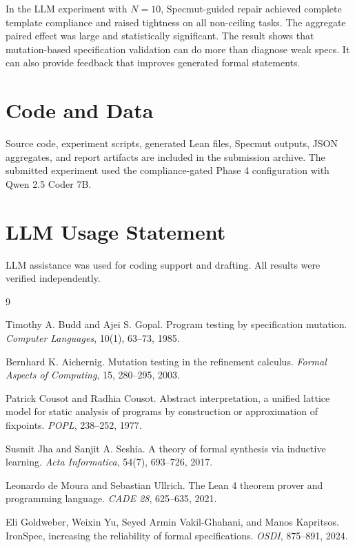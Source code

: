 \documentclass[11pt]{article}
\begin{document}
In the LLM experiment with $N=10$, Specmut-guided repair achieved complete template compliance and raised tightness on all non-ceiling tasks. The aggregate paired effect was large and statistically significant. The result shows that mutation-based specification validation can do more than diagnose weak specs. It can also provide feedback that improves generated formal statements.

\section*{Code and Data}

Source code, experiment scripts, generated Lean files, Specmut outputs, JSON aggregates, and report artifacts are included in the submission archive. The submitted experiment used the compliance-gated Phase 4 configuration with Qwen 2.5 Coder 7B.

\section*{LLM Usage Statement}

LLM assistance was used for coding support and drafting. All results were verified independently.

\begin{thebibliography}{9}


Timothy A. Budd and Ajei S. Gopal. Program testing by specification mutation. \emph{Computer Languages}, 10(1), 63--73, 1985.

Bernhard K. Aichernig. Mutation testing in the refinement calculus. \emph{Formal Aspects of Computing}, 15, 280--295, 2003.

Patrick Cousot and Radhia Cousot. Abstract interpretation, a unified lattice model for static analysis of programs by construction or approximation of fixpoints. \emph{POPL}, 238--252, 1977.

Susmit Jha and Sanjit A. Seshia. A theory of formal synthesis via inductive learning. \emph{Acta Informatica}, 54(7), 693--726, 2017.

Leonardo de Moura and Sebastian Ullrich. The Lean 4 theorem prover and programming language. \emph{CADE 28}, 625--635, 2021.

Eli Goldweber, Weixin Yu, Seyed Armin Vakil-Ghahani, and Manos Kapritsos. IronSpec, increasing the reliability of formal specifications. \emph{OSDI}, 875--891, 2024.

\end{thebibliography}
\end{document}
